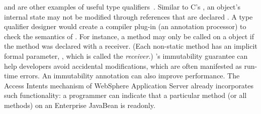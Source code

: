 \documentclass[10pt]{article}
\begin{document}



 and  are other examples of useful type
qualifiers~\cite{ZibinPAAKE2007,BirkaE2004,TschantzE2005,GreenfieldboyceF2005,KnieselT2001,SkoglundW2001,PoratBKM2000}.
Similar to C's , an object's internal state may not be modified
through references that are declared . A type qualifier
designer would create a compiler plug-in (an annotation processor) to check
the semantics of .  For instance, a method may only be
called on a  object if the method was declared with a
 receiver.
(Each non-static method has an implicit formal parameter, , which is
called the \emph{receiver}.)
's immutability guarantee can
help developers avoid accidental modifications, which are often manifested
as run-time errors.
An immutability annotation can also improve performance.
The Access Intents mechanism of WebSphere Application Server already
incorporates such functionality:
a programmer can indicate that a particular method (or all methods) on
an Enterprise JavaBean is readonly.
\end{document}
